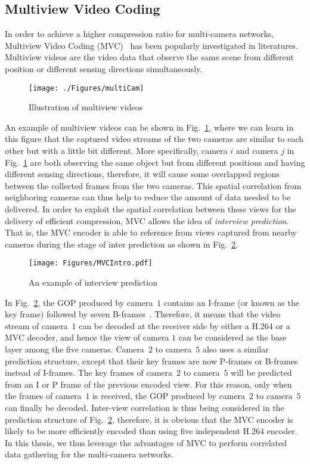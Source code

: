 \subsection{Multiview Video Coding}
\label{sec::MultiviewIntro}
%
In order to achieve a higher compression ratio for multi-camera networks, Multiview Video Coding (MVC)~\cite{MVCoverview} has been popularly investigated in literatures.
Multiview videos are the video data that observe the same scene from different position or different sensing directions simultaneously.
%
\begin{figure}
\begin{center}
\texttt{[image: ./Figures/multiCam]}
\caption{\label{fig::multiCam}Illustration of multiview videos}
\end{center}
\end{figure}
%
An example of multiview videos can be shown in Fig.~\ref{fig::multiCam}, where we can learn in this figure that the captured video streams of the two cameras are similar to each other but with a little bit different.
More specifically, camera $i$ and camera $j$ in Fig.~\ref{fig::multiCam} are both observing the same object but from different positions and having different sensing directions, therefore, it will cause some overlapped regions between the collected frames from the two cameras.
This spatial correlation from neighboring cameras can thus help to reduce the amount of data needed to be delivered.
In order to exploit the spatial correlation between these views for the delivery of efficient compression, MVC allows the idea of \emph{interview prediction}.
That is, the MVC encoder is able to reference from views captured from nearby cameras during the stage of inter prediction as shown in Fig.~\ref{fig::MVC}.
%
\begin{figure}
\centering
\texttt{[image: Figures/MVCIntro.pdf]}
\caption{An example of interview prediction\label{fig::MVC}}
\end{figure}
%

In Fig.~\ref{fig::MVC}, the GOP produced by camera~$1$ contains an I-frame (or known as the key frame) followed by seven B-frames~\cite{HierarchicalBs}.
Therefore, it means that the video stream of camera~$1$ can be decoded at the receiver side by either a H.264 or a MVC decoder, and hence the view of camera $1$ can be considered as the base layer among the five cameras.
Camera~$2$ to camera~$5$ also uses a similar prediction structure, except that their key frames are now P-frames or B-frames instead of I-frames.
The key frames of camera~$2$ to camera~$5$ will be predicted from an I or P frame of the previous encoded view.
For this reason, only when the frames of camera~$1$ is received, the GOP produced by camera~$2$ to camera~$5$ can finally be decoded.
Inter-view correlation is thus being considered in the prediction structure of Fig.~\ref{fig::MVC}, therefore, it is obvious that the MVC encoder is likely to be more efficiently encoded than using five independent H.264 encoder.
In this thesis, we thus leverage the advantages of MVC to perform correlated data gathering for the multi-camera networks.